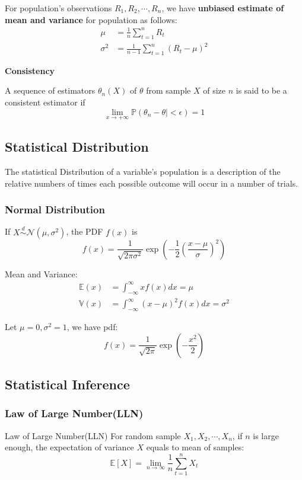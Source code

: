For population's observations $R_1,R_2,\cdots,R_n$, we have \textbf{unbiased estimate of mean and variance} for population as follows:
\[
    \begin{aligned}
        \mu &= \frac{1}{n}\sum_{t=1}^{n}R_t\\
        \sigma^2 &= \frac{1}{n-1}\sum_{t=1}^{n}(R_t-\mu)^2
    \end{aligned}
\]

\textbf{Consistency}

A sequence of estimators $\theta_n(X)$ of $\theta$ from sample $X$ of size $n$ is said to be a consistent estimator if
\[
    \lim_{x \to +\infty}\mathbb{P}(\theta_n - \theta |<\epsilon) = 1
\]



\subsection{Statistical Distribution}
The statistical Distribution of a variable’s population is a description of the relative numbers of times each possible outcome will occur in a number of trials.

\subsubsection{Normal Distribution}
If $X \stackrel{d}{\sim} \mathcal{N}(\mu,\sigma^2)$, the PDF $f(x)$ is 
\[
f(x) = \frac{1}{\sqrt{2\pi \sigma^2}} \exp(-\frac{1}{2}(\frac{x-\mu}{\sigma})^2)
\]

Mean and Variance:
\[
\begin{aligned}
    \mathbb{E}(x) &= \int_{-\infty}^{\infty}xf(x)dx = \mu\\
    \mathbb{V}(x) &= \int_{-\infty}^{\infty}(x-\mu)^2 f(x)dx = \sigma^2
\end{aligned}    
\]

Let $\mu = 0, \sigma^2 = 1$, we have pdf:
\[
f(x) = \frac{1}{\sqrt{2\pi}}\exp(-\frac{x^2}{2})    
\]

\subsection{Statistical Inference}
\subsubsection{Law of Large Number(LLN)}
\begin{theorem}{Law of Large Number(LLN)}
    For random sample $X_1,X_2,\cdots,X_n$, if $n$ is large enough, the expectation of variance $X$ equals to mean of samples:
    \[
    \mathbb{E}[X] = \lim_{n\to \infty}\frac{1}{n}\sum_{t=1}^{n}X_t
    \]
\end{theorem}

